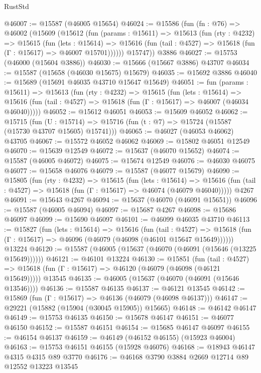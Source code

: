 \begin{lexlean}{RustStd}
\begin{coremodule}
@46007 := @15587 (@46005 @15654)
@46024 := @15586
    (fun (fn : @76) =>
    @46002
      (@15609
        (@15612
          (fun (params : @15611) =>
          @15613
            (fun (rty : @4232) =>
            @15615
              (fun (lets : @15614) =>
              @15616 (fun (tail : @4527) => @15618 (fun (Γ : @15617) => @46007 @15701))))))
        @15747))
    @3886
@46027 := @15753 (@46000 (@15604 @3886))
@46030 := @15666 (@15667 @3886) @43707
@46034 := @15587 (@15658 (@46030 @15675) @15679)
@46035 := @15692 @3886
@46040 := @15689 (@15691 @46035 @43710 @15647 @15649)
@46051 := fun (params : @15611) =>
  @15613
    (fun (rty : @4232) =>
    @15615
      (fun (lets : @15614) =>
      @15616 (fun (tail : @4527) => @15618 (fun (Γ : @15617) => @46007 (@46034 @46040)))))
@46052 := @15612 @46051
@46053 := @15609 @46052
@46062 := @15715
    (fun (U : @15714) => @15716 (fun (t : @7) => @15724 (@15587 (@15730 @43707 @15605) @15741)))
@46065 := @46027 (@46053 @46062) @43705
@46067 := @15572 @46052 @46062
@46069 := @15802 @46051 @12549
@46070 := @15639 @12549
@46072 := @15637 (@46070 @15652)
@46074 := @15587 (@46005 @46072)
@46075 := @15674 @12549
@46076 := @46030 @46075
@46077 := @15658 @46076
@46079 := @15587 (@46077 @15679)
@46090 := @15805
    (fun (rty : @4232) =>
    @15615
      (fun (lets : @15614) =>
      @15616 (fun (tail : @4527) => @15618 (fun (Γ : @15617) => @46074 (@46079 @46040)))))
    @4267
@46091 := @15643 @4267
@46094 := @15637 (@46070 (@46091 @15651))
@46096 := @15587 (@46005 @46094)
@46097 := @15687 @4267
@46098 := @15686 @46097
@46099 := @15690 @46097
@46101 := @46099 @46035 @43710
@46113 := @15827
    (fun (lets : @15614) =>
    @15616
      (fun (tail : @4527) =>
      @15618 (fun (Γ : @15617) => @46096 (@46079 (@46098 (@46101 @15647 @15649))))))
    @13224
@46120 := @15587 (@46005 (@15637 (@46070 (@46091 (@15646 (@13225 @15649))))))
@46121 := @46101 @13224
@46130 := @15851
    (fun (tail : @4527) => @15618 (fun (Γ : @15617) => @46120 (@46079 (@46098 (@46121 @15649)))))
    @13545
@46135 := @46005 (@15637 (@46070 (@46091 (@15646 @13546))))
@46136 := @15587 @46135
@46137 := @46121 @13545
@46142 := @15869 (fun (Γ : @15617) => @46136 (@46079 (@46098 @46137)))
@46147 := @29221 (@15882 (@15904 (@30045 @15905)) @15665)
@46148 := @46142 @46147
@46149 := @15753 @46135
@46150 := @15678 @46147
@46151 := @46077 @46150
@46152 := @15587 @46151
@46154 := @15685 @46147 @46097
@46155 := @46154 @46137
@46159 := @46149 (@46152 @46155) (@15923 @46004)
@46163 := @15753 @46151 @46155 (@15928 @46076)
@46168 := @18943 @46147 @4315 @4315 @89 @3770
@46176 := @46168 @3790 @3884 @2669 @12714 @89 @12552 @13223 @13545

\end{coremodule}
\end{lexlean}
